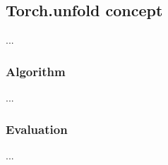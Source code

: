 \subsection{Torch.unfold concept}

...

\subsubsection{Algorithm}

...

\subsubsection{Evaluation}

...

